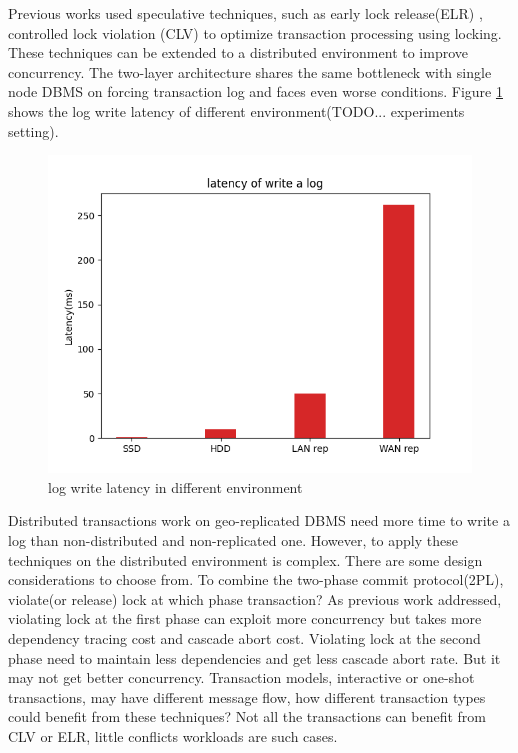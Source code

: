 \documentclass[conference]{IEEEtran}
\begin{document}
Previous works used speculative techniques, such as early lock release(ELR) \cite{EfficientLocking:conf/vldb/KimuraGK12}, controlled lock violation (CLV)\cite{CLV:conf/sigmod/GraefeLKTV13} to optimize transaction processing using locking.
These techniques can be extended to a distributed environment to improve concurrency.
The two-layer architecture shares the same bottleneck with single node DBMS on forcing transaction log and faces even worse conditions.
Figure \ref{fig:log_write_latency} shows the log write latency of different environment(TODO... experiments setting).
\begin{figure}[htbp]
  \centerline{\includegraphics[scale=0.4]{figure/log_write_latency.png}}
  \caption{log write latency in different environment}
  \label{fig:log_write_latency}
\end{figure}

Distributed transactions work on geo-replicated DBMS need more time to write a log than non-distributed and non-replicated one.
However, to apply these techniques on the distributed environment is complex.
There are some design considerations to choose from.
To combine the two-phase commit protocol(2PL), violate(or release) lock at which phase transaction?
As previous work addressed\cite{CLV:conf/sigmod/GraefeLKTV13}, violating lock at the first phase can exploit more concurrency but takes more dependency tracing cost and cascade abort cost.
Violating lock at the second phase need to maintain less dependencies and get less cascade abort rate.
But it may not get better concurrency.
Transaction models, interactive or one-shot transactions, may have different message flow, how different transaction types could benefit from these techniques?
Not all the transactions can benefit from CLV or ELR, little conflicts workloads are such cases.
\end{document}
